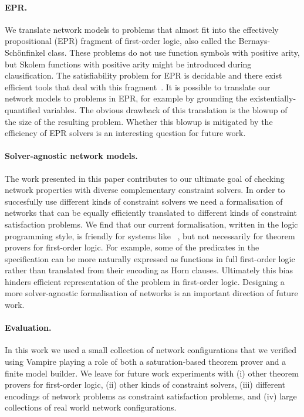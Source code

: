 \paragraph{EPR.}
We translate network models to problems that almost fit into the effectively propositional (EPR) fragment of first-order logic, also called the Bernays-Sch\"onfinkel class. These problems do not use function symbols with positive arity, but Skolem functions with positive arity might be introduced during clausification. The satisfiability problem for EPR is decidable and there exist efficient tools that deal with this fragment~\cite{DBLP:conf/birthday/Korovin13}. It is possible to translate our network models to problems in EPR, for example by grounding the existentially-quantified variables. The obvious drawback of this translation is the blowup of the size of the resulting problem. Whether this blowup is mitigated by the efficiency of EPR solvers is an interesting question for future work.

\paragraph{Solver-agnostic network models.}
The work presented in this paper contributes to our ultimate goal of checking network properties with diverse complementary constraint solvers. In order to succesfully use different kinds of constraint solvers we need a formalisation of networks that can be equally efficiently translated to different kinds of constraint satisfaction problems. We find that our current formalisation, written in the logic programming style, is friendly for systems like \Datalog~\cite{Datalog}, but not necessarily for theorem provers for first-order logic. For example, some of the predicates in the specification can be more naturally expressed as functions in full first-order logic rather than translated from their encoding as Horn clauses. Ultimately this bias hinders efficient representation of the problem in first-order logic. Designing a more solver-agnostic formalisation of networks is an important direction of future work.

\paragraph{Evaluation.} In this work we used a small collection of network configurations that we verified using Vampire playing a role of both a saturation-based theorem prover and a finite model builder. We leave for future work experiments with (i) other theorem provers for first-order logic, (ii) other kinds of constraint solvers, (iii) different encodings of network problems as constraint satisfaction problems, and (iv) large collections of real world network configurations.


